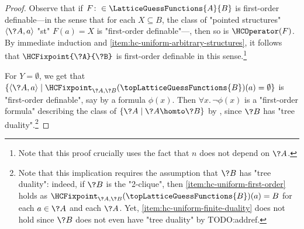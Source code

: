 \begin{proof}
	Observe that if $F\colon \in \LatticeGuessFunctions{A}{B}$ is first-order
	definable---in the sense that for each $X \subseteq B$, the class of "pointed structures"
	$\langle \?A, a\rangle$ "st" $F(a) = X$ is "first-order definable"---, then so is
	$\HCOperator(F)$. By immediate induction and \eqref{item:hc-uniform-arbitrary-structures},
	it follows that $\HCFixpoint{\?A}{\?B}$ is first-order definable in this sense.\footnote{Note 
	that this proof crucially uses the fact that $n$ does not depend on $\?A$.}

	For $Y = \emptyset$, we get that $\{\langle \?A, a \rangle \mid \HCFixpoint_{\?A,\?B}(\topLatticeGuessFunctions{B})(a) = \emptyset\}$ is "first-order definable", say by a formula
	$\phi(x)$. Then $\forall x.\, \neg \phi(x)$ is a "first-order formula" describing the class of
	$\{\?A \mid \?A \homto \?B\}$ by , since
	$\?B$ has "tree duality".\footnote{Note that this implication requires the assumption that
	$\?B$ has "tree duality": indeed, if $\?B$ is the "2-clique", then \eqref{item:hc-uniform-first-order} holds as $\HCFixpoint_{\?A,\?B}(\topLatticeGuessFunctions{B})(a) = B$ for each $a\in \?A$ and each $\?A$. Yet, \eqref{item:hc-uniform-finite-duality} does not hold since $\?B$ does not even have "tree duality" by TODO:addref.} 


\end{proof}
